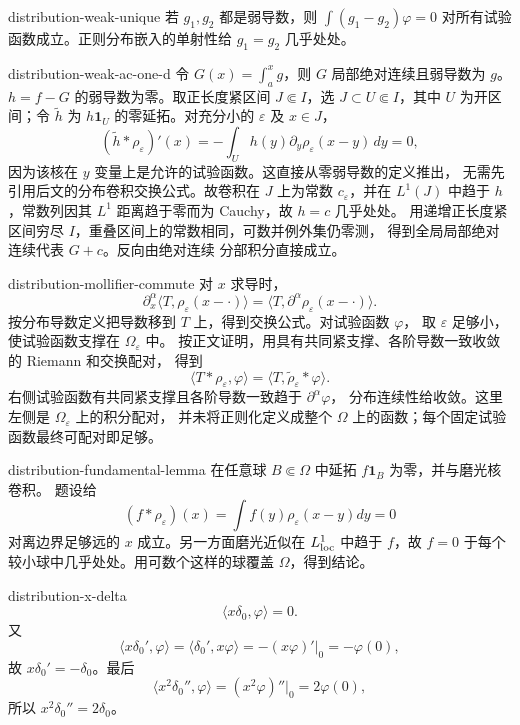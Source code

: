 \begin{solution}{distribution-weak-unique}
若 \(g_1,g_2\) 都是弱导数，则
\(\int(g_1-g_2)\varphi=0\) 对所有试验函数成立。正则分布嵌入的单射性给
\(g_1=g_2\) 几乎处处。
\end{solution}

\begin{solution}{distribution-weak-ac-one-d}
令 \(G(x)=\int_a^xg\)，则 \(G\) 局部绝对连续且弱导数为 \(g\)。
\(h=f-G\) 的弱导数为零。取正长度紧区间 \(J\Subset I\)，选
\(J\subset U\Subset I\)，其中 \(U\) 为开区间；令 \(\widetilde h\)
为 \(h\mathbf1_U\) 的零延拓。对充分小的 \(\varepsilon\) 及 \(x\in J\)，
\[
 (\widetilde h*\rho_\varepsilon)'(x)
 =-\int_U h(y)\partial_y\rho_\varepsilon(x-y)\,dy=0,
\]
因为该核在 \(y\) 变量上是允许的试验函数。这直接从零弱导数的定义推出，
无需先引用后文的分布卷积交换公式。故卷积在 \(J\) 上为常数 \(c_\varepsilon\)，并在 \(L^1(J)\) 中趋于
\(h\)，常数列因其 \(L^1\) 距离趋于零而为 Cauchy，故 \(h=c\) 几乎处处。
用递增正长度紧区间穷尽 \(I\)，重叠区间上的常数相同，可数并例外集仍零测，
得到全局局部绝对连续代表 \(G+c\)。反向由绝对连续
分部积分直接成立。
\end{solution}

\begin{solution}{distribution-mollifier-commute}
对 \(x\) 求导时，
\[
 \partial_x^\alpha\langle T,\rho_\varepsilon(x-\cdot)\rangle
 =\langle T,\partial^\alpha\rho_\varepsilon(x-\cdot)\rangle.
\]
按分布导数定义把导数移到 \(T\) 上，得到交换公式。对试验函数 \(\varphi\)，
取 \(\varepsilon\) 足够小，使试验函数支撑在 \(\Omega_\varepsilon\) 中。
按正文证明，用具有共同紧支撑、各阶导数一致收敛的 Riemann 和交换配对，
得到
\[
 \langle T*\rho_\varepsilon,\varphi\rangle
 =\langle T,\widetilde\rho_\varepsilon*\varphi\rangle.
\]
右侧试验函数有共同紧支撑且各阶导数一致趋于 \(\partial^\alpha\varphi\)，
分布连续性给收敛。这里左侧是 \(\Omega_\varepsilon\) 上的积分配对，
并未将正则化定义成整个 \(\Omega\) 上的函数；每个固定试验函数最终可配对即足够。
\end{solution}

\begin{solution}{distribution-fundamental-lemma}
在任意球 \(B\Subset\Omega\) 中延拓 \(f\mathbf1_B\) 为零，并与磨光核卷积。
题设给
\[
 (f*\rho_\varepsilon)(x)
 =\int f(y)\rho_\varepsilon(x-y)dy=0
\]
对离边界足够远的 \(x\) 成立。另一方面磨光近似在 \(L^1_{\rm loc}\) 中趋于
\(f\)，故 \(f=0\) 于每个较小球中几乎处处。用可数个这样的球覆盖
\(\Omega\)，得到结论。
\end{solution}

\begin{solution}{distribution-x-delta}
\[
 \langle x\delta_0,\varphi\rangle=0.
\]
又
\[
 \langle x\delta_0',\varphi\rangle
 =\langle\delta_0',x\varphi\rangle
 =-(x\varphi)'|_{0}=-\varphi(0),
\]
故 \(x\delta_0'=-\delta_0\)。最后
\[
 \langle x^2\delta_0'',\varphi\rangle
 =(x^2\varphi)''|_0=2\varphi(0),
\]
所以 \(x^2\delta_0''=2\delta_0\)。
\end{solution}

